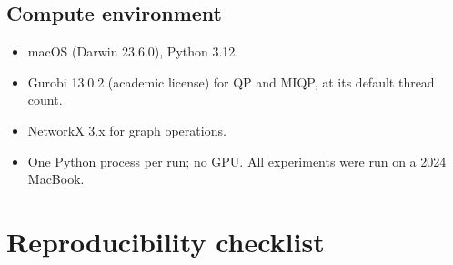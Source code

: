 \documentclass[11pt]{article}
\begin{document}
\subsection{Compute environment}\label{app:compute}

\begin{itemize}
  \item macOS (Darwin 23.6.0), Python 3.12.
  \item Gurobi 13.0.2 (academic license) for QP and MIQP, at its
    default thread count.
  \item NetworkX 3.x for graph operations.
  \item One Python process per run; no GPU. All experiments were run
    on a 2024 MacBook.
\end{itemize}

\section{Reproducibility checklist}\label{app:reproducibility}
\end{document}
